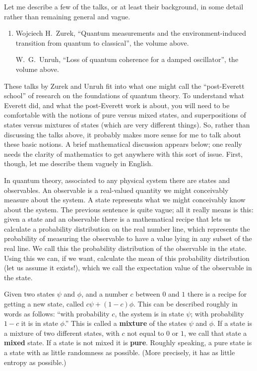 \documentclass{article}
\begin{document}
Let me describe a few of the talks, or at least their background, in
some detail rather than remaining general and vague.

\begin{enumerate}
\def\labelenumi{\arabic{enumi})}
\setcounter{enumi}{1}
\item
  Wojciech H.\ Zurek, ``Quantum measurements and the environment-induced transition from quantum to classical'', the volume above.

 W.\ G.\ Unruh, ``Loss of quantum coherence for a damped oscillator'', the volume above.
\end{enumerate}

These talks by Zurek and Unruh fit into what one might call the
``post-Everett school'' of research on the foundations of quantum
theory. To understand what Everett did, and what the post-Everett work
is about, you will need to be comfortable with the notions of pure
versus mixed states, and superpositions of states versus mixtures of
states (which are very different things). So, rather than discussing the
talks above, it probably makes more sense for me to talk about these
basic notions. A brief mathematical discussion appears below; one really
needs the clarity of mathematics to get anywhere with this sort of
issue. First, though, let me describe them vaguely in English.

In quantum theory, associated to any physical system there are states
and observables. An observable is a real-valued quantity we might
conceivably measure about the system. A state represents what we might
conceivably know about the system. The previous sentence is quite vague;
all it really means is this: given a state and an observable there is a
mathematical recipe that lets us calculate a probability distribution on
the real number line, which represents the probability of measuring the
observable to have a value lying in any subset of the real line. We call
this the probability distribution of the observable in the state. Using
this we can, if we want, calculate the mean of this probability
distribution (let us assume it exists!), which we call the expectation
value of the observable in the state.

Given two states \(\psi\) and \(\phi\), and a number \(c\) between \(0\)
and \(1\) there is a recipe for getting a new state, called
\(c \psi + (1-c)\phi\). This can be described roughly in words as
follows: ``with probability \(c\), the system is in state \(\psi\); with
probability \(1-c\) it is in state \(\phi\).'' This is called a
\textbf{mixture} of the states \(\psi\) and \(\phi\). If a state is a
mixture of two different states, with \(c\) not equal to \(0\) or \(1\),
we call that state a \textbf{mixed} state. If a state is not mixed it is
\textbf{pure}. Roughly speaking, a pure state is a state with as little
randomness as possible. (More precisely, it has as little entropy as
possible.)
\end{document}
